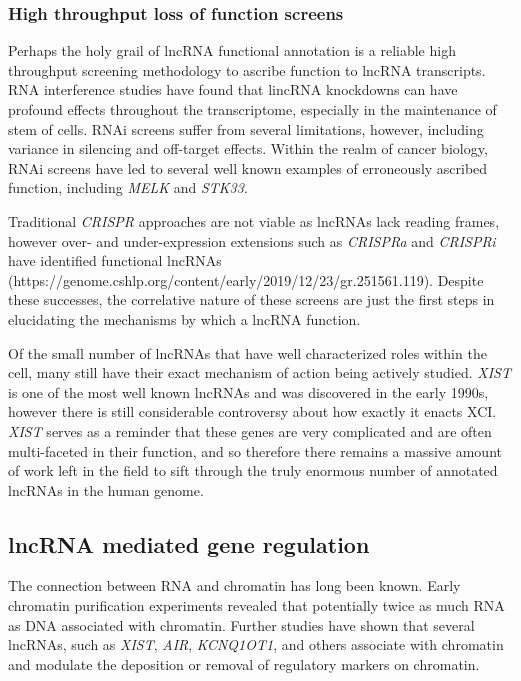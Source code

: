 \subsubsection{High throughput loss of function screens}
Perhaps the holy grail of lncRNA functional annotation is a reliable high throughput screening methodology to ascribe function to lncRNA transcripts. RNA interference studies have found that lincRNA knockdowns can have profound effects throughout the transcriptome, especially in the maintenance of stem of cells. RNAi screens suffer from several limitations, however, including variance in silencing and off-target effects. Within the realm of cancer biology, RNAi screens have led to several well known examples of erroneously ascribed function, including \emph{MELK} and \emph{STK33}.

Traditional \emph{CRISPR} approaches are not viable as lncRNAs lack reading frames, however over- and under-expression extensions such as \emph{CRISPRa} and \emph{CRISPRi} have identified functional lncRNAs (https://genome.cshlp.org/content/early/2019/12/23/gr.251561.119). Despite these successes, the correlative nature of these screens are just the first steps in elucidating the mechanisms by which a lncRNA function. 

Of the small number of lncRNAs that have well characterized roles within the cell, many still have their exact mechanism of action being actively studied. \emph{XIST} is one of the most well known lncRNAs and was discovered in the early 1990s, however there is still considerable controversy about how exactly it enacts XCI. \emph{XIST} serves as a reminder that these genes are very complicated and are often multi-faceted in their function, and so therefore there remains a massive amount of work left in the field to sift through the truly enormous number of annotated lncRNAs in the human genome.

\subsection{lncRNA mediated gene regulation}

The connection between RNA and chromatin has long been known. Early chromatin purification experiments revealed that potentially twice as much RNA as DNA associated with chromatin. Further studies have shown that several lncRNAs, such as \emph{XIST}, \emph{AIR}, \emph{KCNQ1OT1}, and others associate with chromatin and modulate the deposition or removal of regulatory markers on chromatin. 

